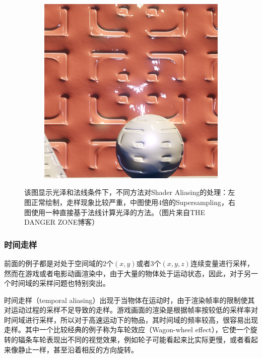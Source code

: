 \begin{figure}
\begin{fullwidth}
\begin{subfigure}[b]{0.32\thewidth}
	\end{subfigure}
	\begin{subfigure}[b]{0.32\thewidth}
		\includegraphics[width=1.\textwidth]{figures/intro/specaliasing_clean}
	\end{subfigure}
\caption{该图显示光泽和法线条件下，不同方法对Shader Aliasing的处理：左图正常绘制，走样现象比较严重，中图使用4倍的Supersampling，右图使用一种直接基于法线计算光泽的方法。（图片来自THE DANGER ZONE博客）}
\label{f:intro-shader-aliasing}
\end{fullwidth}
\end{figure}




\subsubsection{时间走样}
前面的例子都是对处于空间域的2个$(x,y)$或者3个$(x,y,z)$连续变量进行采样，然而在游戏或者电影动画渲染中，由于大量的物体处于运动状态，因此，对于另一个时间域的采样问题也特别突出。

时间走样（temporal aliasing）出现于当物体在运动时，由于渲染帧率的限制使其对运动过程的采样不足导致的走样。游戏画面的渲染是根据帧率按较低的采样率对时间域进行采样，所以对于高速运动下的物品，其时间域的频率较高，很容易出现走样。其中一个比较经典的例子称为车轮效应（Wagon-wheel effect），它使一个旋转的辐条车轮表现出不同的视觉效果，例如轮子可能看起来比实际更慢，或者看起来像静止一样，甚至沿着相反的方向旋转。

